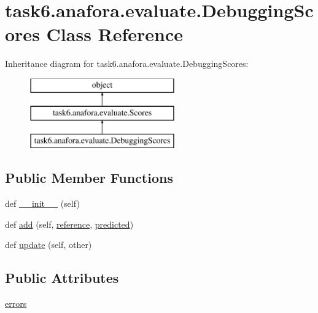 \hypertarget{classtask6_1_1anafora_1_1evaluate_1_1DebuggingScores}{}\section{task6.\+anafora.\+evaluate.\+Debugging\+Scores Class Reference}
\label{classtask6_1_1anafora_1_1evaluate_1_1DebuggingScores}
Inheritance diagram for task6.\+anafora.\+evaluate.\+Debugging\+Scores\+:\begin{figure}[H]
\begin{center}
\leavevmode
\includegraphics[height=3.000000cm]{classtask6_1_1anafora_1_1evaluate_1_1DebuggingScores}
\end{center}
\end{figure}
\subsection*{Public Member Functions}
\begin{DoxyCompactItemize}
\item 
def \hyperlink{classtask6_1_1anafora_1_1evaluate_1_1DebuggingScores_a73b5973f7c93e1ca8b91e1e93b6016fe}{\+\_\+\+\_\+init\+\_\+\+\_\+} (self)
\item 
def \hyperlink{classtask6_1_1anafora_1_1evaluate_1_1DebuggingScores_af7ed9702c0db4cb17f642419ff734795}{add} (self, \hyperlink{classtask6_1_1anafora_1_1evaluate_1_1Scores_a9c17cca5f0fea67554a3509fef3b7cb5}{reference}, \hyperlink{classtask6_1_1anafora_1_1evaluate_1_1Scores_ae1bf8971c36ccbe9f991c6b21a52bf9d}{predicted})
\item 
def \hyperlink{classtask6_1_1anafora_1_1evaluate_1_1DebuggingScores_aca1f0eda0796e2ac6fe857a512423ad7}{update} (self, other)
\end{DoxyCompactItemize}
\subsection*{Public Attributes}
\begin{DoxyCompactItemize}
\item 
\hyperlink{classtask6_1_1anafora_1_1evaluate_1_1DebuggingScores_a53e5dfd1a1b463defaa94672fbb77efb}{errors}
\end{DoxyCompactItemize}


